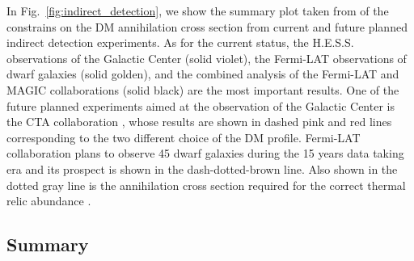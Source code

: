 \documentclass[12pt,twoside,book]{article}
\begin{document}
In Fig.~\ref{fig:indirect_detection}, we show the summary plot taken from \cite{Roszkowski:2017nbc} of the constrains on the DM annihilation cross section from current and future planned indirect detection experiments.
As for the current status, the H.E.S.S. observations of the Galactic Center \cite{Abdallah:2016ygi} (solid violet), the Fermi-LAT observations of dwarf galaxies \cite{Fermi-LAT:2016uux} (solid golden), and the combined analysis of the Fermi-LAT and MAGIC collaborations \cite{Ahnen:2016qkx} (solid black) are the most important results.
One of the future planned experiments aimed at the observation of the Galactic Center is the CTA collaboration \cite{Carr:2015hta}, whose results are shown in dashed pink and red lines corresponding to the two different choice of the DM profile.
Fermi-LAT collaboration plans to observe 45 dwarf galaxies during the 15 years data taking era \cite{Charles:2016pgz} and its prospect is shown in the dash-dotted-brown line.
Also shown in the dotted gray line is the annihilation cross section required for the correct thermal relic abundance \cite{Steigman:2012nb}.



\subsection{Summary}
\label{sec:summary_DM}





\end{document}
